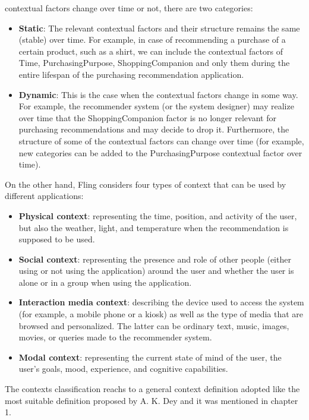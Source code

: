 \begin{enumerate}
contextual factors change over time or not, there are two categories: 
	\begin{itemize}
	\item \textbf{Static}: The relevant contextual factors and their structure
	remains the same (stable) over time. For example, in case of recommending a
	purchase of a certain product, such as a shirt, we can include the
	contextual factors of Time, PurchasingPurpose, ShoppingCompanion and only
	them during the entire lifespan of the purchasing recommendation
	application.
	\item \textbf {Dynamic}: This is the case when the contextual factors change in 
	some way. For example, the recommender system (or the system designer) may 
	realize over time that the ShoppingCompanion factor is no longer relevant for 
	purchasing recommendations and may decide to drop it. Furthermore, the structure 
	of some of the contextual factors can change over time (for example, new 
	categories can be added to the PurchasingPurpose contextual factor over time).
	\end{itemize}
\end{enumerate} 
On the other hand, Fling\cite{fling2009mobile} considers four types of context that 
can be used by different applications: 
\begin{itemize} 
\item \textbf{Physical context}: representing the time, position, and activity 
of the user, but also the weather, light, and temperature when the 
recommendation is supposed to be used. 
\item \textbf{Social context}: representing the presence
and role of other people (either using or not using the application) around the
user and whether the user is alone or in a group when using the application.
\item \textbf{Interaction media context}: describing the device used to access
the system (for example, a mobile phone or a kiosk) as well as the type of media
that are browsed and personalized. The latter can be ordinary text, music,
images, movies, or queries made to the recommender system. 
\item \textbf{Modal context}: representing the current state of mind of the user, 
the user’s goals, mood, experience, and cognitive capabilities.  
\end{itemize}
The contexts classification reachs to a general context definition
adopted like the most suitable definition proposed by A. K. Dey  and it
was mentioned in chapter 1.\\ 
